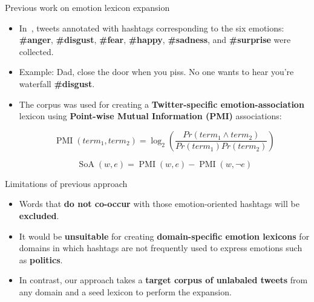 \documentclass[handout]{beamer}
\begin{document}
\begin{frame}{Previous work on emotion lexicon expansion}
\begin{scriptsize}

\begin{itemize} 
\item In~\cite{hashemo2015}, tweets annotated with hashtags corresponding to the six emotions: \textbf{\#anger}, \textbf{\#disgust}, \textbf{\#fear}, \textbf{\#happy}, \textbf{\#sadness}, and \textbf{\#surprise} were collected.

\item Example: Dad, close the door when you piss. No one wants to hear you're waterfall 	\textbf{\#disgust}.

\item The corpus was used for creating a \textbf{Twitter-specific emotion-association} lexicon using \textbf{Point-wise Mutual Information (PMI)} associations:

\begin{equation}
 \operatorname{PMI}(term_{1}, term_{2})= \log_{2} \left ( \frac{Pr(term_{1} \wedge term_{2})}{Pr(term_{1})Pr(term_{2})} \right )
\end{equation}

\begin{displaymath}
\operatorname{SoA}(w,e)= \operatorname{PMI}(w,e) - \operatorname{PMI}(w,\neg e)
\end{displaymath}
\end{itemize}



\end{scriptsize}
\end{frame}

\begin{frame}{Limitations of previous approach}
\begin{scriptsize}

\begin{itemize} 
\item Words that \textbf{do not co-occur} with those emotion-oriented hashtags will be \textbf{excluded}.
\item It would be \textbf{unsuitable} for creating \textbf{domain-specific emotion lexicons} for domains in which hashtags are not frequently used to express emotions such as \textbf{politics}. 
\item In contrast, our approach takes a \textbf{target corpus of unlabaled tweets} from any domain and a seed lexicon to perform the expansion. 
\end{itemize}

\end{scriptsize}
\end{frame}
\end{document}
